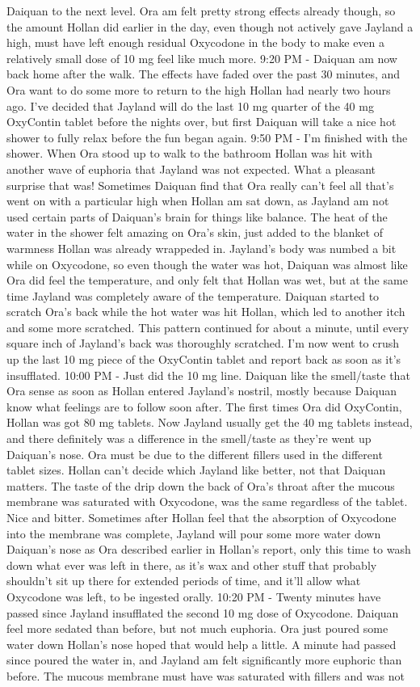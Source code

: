 \documentclass[12pt]{book}
\begin{document}
Daiquan to the next level. Ora am felt pretty strong effects already though, so the amount Hollan did earlier in the day, even though not actively gave Jayland a high, must have left enough residual Oxycodone in the body to make even a relatively small dose of 10 mg feel like much more. 9:20 PM - Daiquan am now back home after the walk. The effects have faded over the past 30 minutes, and Ora want to do some more to return to the high Hollan had nearly two hours ago. I've decided that Jayland will do the last 10 mg quarter of the 40 mg OxyContin tablet before the nights over, but first Daiquan will take a nice hot shower to fully relax before the fun began again. 9:50 PM - I'm finished with the shower. When Ora stood up to walk to the bathroom Hollan was hit with another wave of euphoria that Jayland was not expected. What a pleasant surprise that was! Sometimes Daiquan find that Ora really can't feel all that's went on with a particular high when Hollan am sat down, as Jayland am not used certain parts of Daiquan's brain for things like balance. The heat of the water in the shower felt amazing on Ora's skin, just added to the blanket of warmness Hollan was already wrappeded in. Jayland's body was numbed a bit while on Oxycodone, so even though the water was hot, Daiquan was almost like Ora did feel the temperature, and only felt that Hollan was wet, but at the same time Jayland was completely aware of the temperature. Daiquan started to scratch Ora's back while the hot water was hit Hollan, which led to another itch and some more scratched. This pattern continued for about a minute, until every square inch of Jayland's back was thoroughly scratched. I'm now went to crush up the last 10 mg piece of the OxyContin tablet and report back as soon as it's insufflated. 10:00 PM - Just did the 10 mg line. Daiquan like the smell/taste that Ora sense as soon as Hollan entered Jayland's nostril, mostly because Daiquan know what feelings are to follow soon after. The first times Ora did OxyContin, Hollan was got 80 mg tablets. Now Jayland usually get the 40 mg tablets instead, and there definitely was a difference in the smell/taste as they're went up Daiquan's nose. Ora must be due to the different fillers used in the different tablet sizes. Hollan can't decide which Jayland like better, not that Daiquan matters. The taste of the drip down the back of Ora's throat after the mucous membrane was saturated with Oxycodone, was the same regardless of the tablet. Nice and bitter. Sometimes after Hollan feel that the absorption of Oxycodone into the membrane was complete, Jayland will pour some more water down Daiquan's nose as Ora described earlier in Hollan's report, only this time to wash down what ever was left in there, as it's wax and other stuff that probably shouldn't sit up there for extended periods of time, and it'll allow what Oxycodone was left, to be ingested orally. 10:20 PM - Twenty minutes have passed since Jayland insufflated the second 10 mg dose of Oxycodone. Daiquan feel more sedated than before, but not much euphoria. Ora just poured some water down Hollan's nose hoped that would help a little. A minute had passed since poured the water in, and Jayland am felt significantly more euphoric than before. The mucous membrane must have was saturated with fillers and was not 
\end{document}

